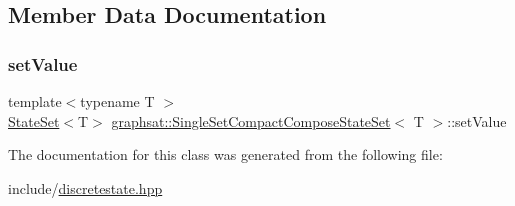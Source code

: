 \subsection{Member Data Documentation}
\mbox{\label{classgraphsat_1_1_single_set_compact_compose_state_set_adf90edd590751b9f26c7a267cf3ec0a0}} 
\subsubsection{\texorpdfstring{setValue}{setValue}}
{\footnotesize\ttfamily template$<$typename T $>$ \\
\mbox{\hyperlink{classgraphsat_1_1_state_set}{State\+Set}}$<$T$>$ \mbox{\hyperlink{classgraphsat_1_1_single_set_compact_compose_state_set}{graphsat\+::\+Single\+Set\+Compact\+Compose\+State\+Set}}$<$ T $>$\+::set\+Value\hspace{0.3cm}{\ttfamily [private]}}



The documentation for this class was generated from the following file\+:\begin{DoxyCompactItemize}
\item 
include/\mbox{\hyperlink{discretestate_8hpp}{discretestate.\+hpp}}\end{DoxyCompactItemize}
